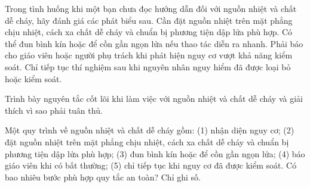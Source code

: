 \begin{ex}
Trong tình huống khi một bạn chưa đọc hướng dẫn đối với nguồn nhiệt và chất dễ cháy, hãy đánh giá các phát biểu sau.
\choiceTF
{\True Cần đặt nguồn nhiệt trên mặt phẳng chịu nhiệt, cách xa chất dễ cháy và chuẩn bị phương tiện dập lửa phù hợp.}
{Có thể đun bình kín hoặc để cồn gần ngọn lửa nếu thao tác diễn ra nhanh.}
{\True Phải báo cho giáo viên hoặc người phụ trách khi phát hiện nguy cơ vượt khả năng kiểm soát.}
{\True Chỉ tiếp tục thí nghiệm sau khi nguyên nhân nguy hiểm đã được loại bỏ hoặc kiểm soát.}
\end{ex}

\begin{bt}
Trình bày nguyên tắc cốt lõi khi làm việc với nguồn nhiệt và chất dễ cháy và giải thích vì sao phải tuân thủ.
\end{bt}

\begin{ex}
Một quy trình về nguồn nhiệt và chất dễ cháy gồm: (1) nhận diện nguy cơ; (2) đặt nguồn nhiệt trên mặt phẳng chịu nhiệt, cách xa chất dễ cháy và chuẩn bị phương tiện dập lửa phù hợp; (3) đun bình kín hoặc để cồn gần ngọn lửa; (4) báo giáo viên khi có bất thường; (5) chỉ tiếp tục khi nguy cơ đã được kiểm soát. Có bao nhiêu bước phù hợp quy tắc an toàn? Chỉ ghi số.
\end{ex}

